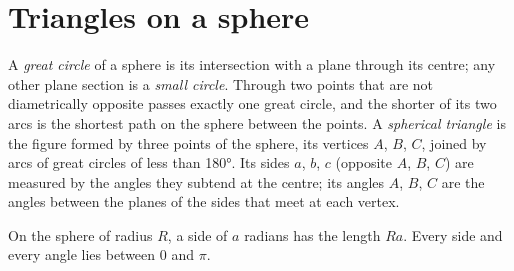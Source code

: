 \section{Triangles on a sphere}

\begin{definition}\label{def:b1:spherical-astronomy:spherical-triangle}
A \emph{great circle} of a sphere is its intersection
with a plane through its centre; any other plane section is a \emph{small
circle}. Through two points that are not diametrically
opposite passes exactly one great circle, and the shorter of its two arcs is
the shortest path on the sphere between the points. A \emph{spherical
triangle} is the figure formed by three points of
the sphere, its vertices $A$, $B$, $C$, joined by arcs of great circles of
less than \ang{180}. Its sides $a$, $b$, $c$ (opposite $A$, $B$, $C$) are
measured by the angles they subtend at the centre; its angles $A$, $B$, $C$
are the angles between the planes of the sides that meet at each vertex.
\end{definition}

On the sphere of radius $R$, a side of $a$ radians has the length $Ra$. Every
side and every angle lies between $0$ and $\pi$.

